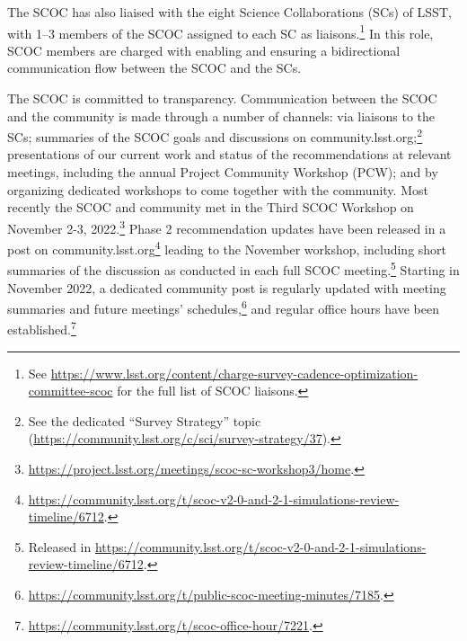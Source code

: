 The SCOC has also liaised with the eight Science Collaborations (SCs) of LSST, with 1--3 members of the SCOC assigned to each SC as liaisons.\footnote{See \url{https://www.lsst.org/content/charge-survey-cadence-optimization-committee-scoc} for the full list of SCOC liaisons.} In this role, SCOC members are charged with enabling and ensuring a bidirectional communication flow between the SCOC and the SCs. 

The SCOC is committed to transparency. Communication between the SCOC and the community is made through a number of channels: via liaisons to the SCs; summaries of the SCOC goals and discussions on community.lsst.org;\footnote{See the dedicated ``Survey Strategy'' topic (\url{https://community.lsst.org/c/sci/survey-strategy/37}).} presentations of our current work and status of the recommendations at relevant meetings, including the annual Project Community Workshop (PCW); and by organizing dedicated workshops to come together with the community. Most recently the SCOC and community met in the Third SCOC Workshop on November 2-3, 2022.\footnote{\url{https://project.lsst.org/meetings/scoc-sc-workshop3/home}.} Phase 2 recommendation updates have been released in a post on community.lsst.org\footnote{\url{https://community.lsst.org/t/scoc-v2-0-and-2-1-simulations-review-timeline/6712}.} leading to the November workshop, including short summaries of the discussion as conducted in each full SCOC meeting.\footnote{Released in \url{https://community.lsst.org/t/scoc-v2-0-and-2-1-simulations-review-timeline/6712}.} Starting in November 2022, a dedicated community post is regularly updated with meeting summaries and future meetings' schedules,\footnote{\url{https://community.lsst.org/t/public-scoc-meeting-minutes/7185}.} and regular office hours have been established.\footnote{\url{https://community.lsst.org/t/scoc-office-hour/7221}.}

